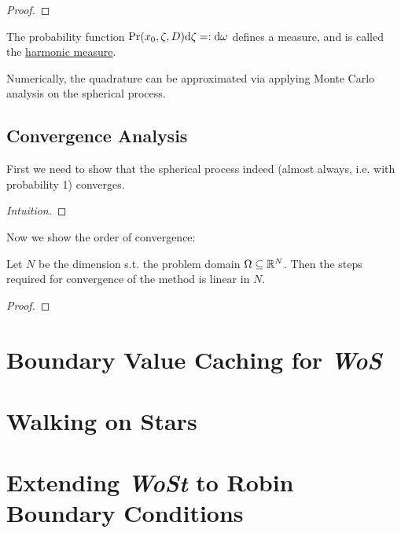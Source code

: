 \documentclass[10pt]{article}
\begin{document}
\begin{proof}
    
\end{proof}

\begin{remark}
    The probability function $\mathrm{Pr}(x_0, \zeta, D) \mathrm{d} \zeta =: \mathrm{d} \omega$ defines a measure, and is called the \underline{harmonic measure}.
\end{remark}

\textstart
Numerically, the quadrature can be approximated via applying Monte Carlo analysis on the spherical process.

\subsection{Convergence Analysis}

\textstart
First we need to show that the spherical process indeed (almost always, i.e. with probability 1) converges.

\begin{proposition}
    
\end{proposition}

\begin{proof}[Intuition]
    
\end{proof}

\textstart
Now we show the order of convergence:

\begin{theorem}
    Let $N$ be the dimension s.t. the problem domain $\Omega \subseteq \mathbb{R}^N$. Then the steps required for convergence of the method is linear in $N$. 
\end{theorem}

\begin{proof}
    
\end{proof}

\section{Boundary Value Caching for \emph{WoS} \cite{BVCWoS}}

\section{Walking on Stars \cite{WalkOnStars}}

\section{Extending \emph{WoSt} to Robin Boundary Conditions\cite{WalkinRobin}}

\printbibliography
\end{document}
